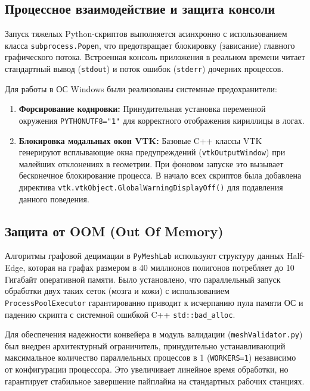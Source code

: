 \documentclass[a4paper,14pt]{article}
\begin{document}
\subsection{Процессное взаимодействие и защита консоли}
Запуск тяжелых Python-скриптов выполняется асинхронно с использованием класса \texttt{subprocess.Popen}, что предотвращает блокировку (зависание) главного графического потока. Встроенная консоль приложения в реальном времени читает стандартный вывод (\texttt{stdout}) и поток ошибок (\texttt{stderr}) дочерних процессов.

Для работы в ОС Windows были реализованы системные предохранители:
\begin{enumerate}
    \item \textbf{Форсирование кодировки:} Принудительная установка переменной окружения \texttt{PYTHONUTF8="1"} для корректного отображения кириллицы в логах.
    \item \textbf{Блокировка модальных окон VTK:} Базовые C++ классы VTK генерируют всплывающие окна предупреждений (\texttt{vtkOutputWindow}) при малейших отклонениях в геометрии. При фоновом запуске это вызывает бесконечное блокирование процесса. В начало всех скриптов была добавлена директива \texttt{vtk.vtkObject.GlobalWarningDisplayOff()} для подавления данного поведения.
\end{enumerate}

\subsection{Защита от OOM (Out Of Memory)}
Алгоритмы графовой децимации в \texttt{PyMeshLab} используют структуру данных Half-Edge, которая на графах размером в 40 миллионов полигонов потребляет до 10 Гигабайт оперативной памяти. Было установлено, что параллельный запуск обработки двух таких сеток (мозга и кожи) с использованием \texttt{ProcessPoolExecutor} гарантированно приводит к исчерпанию пула памяти ОС и падению скрипта с системной ошибкой C++ \texttt{std::bad\_alloc}.

Для обеспечения надежности конвейера в модуль валидации (\texttt{meshValidator.py}) был внедрен архитектурный ограничитель, принудительно устанавливающий максимальное количество параллельных процессов в 1 (\texttt{WORKERS=1}) независимо от конфигурации процессора. Это увеличивает линейное время обработки, но гарантирует стабильное завершение пайплайна на стандартных рабочих станциях.

\newpage
\end{document}
